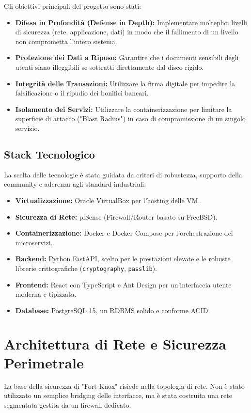 \documentclass[a4paper, 12pt, titlepage]{article}
\begin{document}
Gli obiettivi principali del progetto sono stati:
\begin{itemize}
    \item \textbf{Difesa in Profondità (Defense in Depth):} Implementare molteplici livelli di sicurezza (rete, applicazione, dati) in modo che il fallimento di un livello non comprometta l'intero sistema.
    \item \textbf{Protezione dei Dati a Riposo:} Garantire che i documenti sensibili degli utenti siano illeggibili se sottratti direttamente dal disco rigido.
    \item \textbf{Integrità delle Transazioni:} Utilizzare la firma digitale per impedire la falsificazione o il ripudio dei bonifici bancari.
    \item \textbf{Isolamento dei Servizi:} Utilizzare la containerizzazione per limitare la superficie di attacco ("Blast Radius") in caso di compromissione di un singolo servizio.
\end{itemize}

\subsection{Stack Tecnologico}
La scelta delle tecnologie è stata guidata da criteri di robustezza, supporto della community e aderenza agli standard industriali:
\begin{itemize}
    \item \textbf{Virtualizzazione:} Oracle VirtualBox per l'hosting delle VM.
    \item \textbf{Sicurezza di Rete:} pfSense (Firewall/Router basato su FreeBSD).
    \item \textbf{Containerizzazione:} Docker e Docker Compose per l'orchestrazione dei microservizi.
    \item \textbf{Backend:} Python FastAPI, scelto per le prestazioni elevate e le robuste librerie crittografiche (\texttt{cryptography}, \texttt{passlib}).
    \item \textbf{Frontend:} React con TypeScript e Ant Design per un'interfaccia utente moderna e tipizzata.
    \item \textbf{Database:} PostgreSQL 15, un RDBMS solido e conforme ACID.
\end{itemize}

\section{Architettura di Rete e Sicurezza Perimetrale}
La base della sicurezza di "Fort Knox" risiede nella topologia di rete. Non è stato utilizzato un semplice bridging delle interfacce, ma è stata costruita una rete segmentata gestita da un firewall dedicato.
\end{document}
